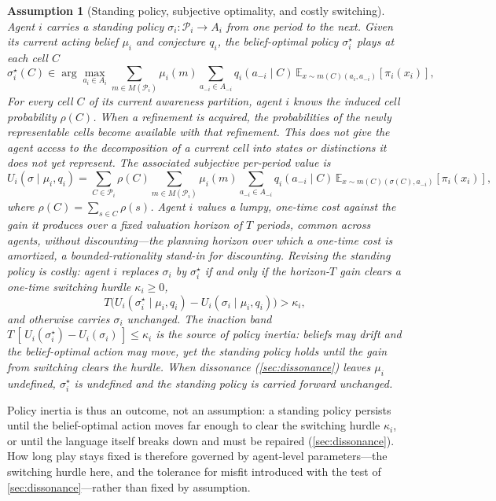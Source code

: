 \documentclass[11pt]{article}
\newtheorem{assumption}{Assumption}[section]
\theoremstyle{definition}
\begin{document}
\begin{assumption}[Standing policy, subjective optimality, and costly switching]
\label{ass:commitment}
Agent $i$ carries a \emph{standing policy} $\sigma_i:\mathcal P_i\to A_i$ from one period to the next.
Given its current acting belief $\mu_i$ and conjecture $q_i$, the \emph{belief-optimal} policy $\sigma_i^{\star}$ plays at each cell $C$
\begin{equation}
\sigma_i^{\star}(C)\in\arg\max_{a_i\in A_i}
\sum_{m\in M(\mathcal P_i)}\mu_i(m)
\sum_{a_{-i}\in A_{-i}}q_i(a_{-i}\mid C)\,
\mathbb E_{x\sim m(C)(a_i,a_{-i})}\!\left[\pi_i(x_i)\right],
\label{eq:subjective-optimality}
\end{equation}
For every cell \(C\) of its current awareness partition, agent \(i\) knows the induced cell probability \(\rho(C)\).
When a refinement is acquired, the probabilities of the newly representable cells become available with that refinement.
This does not give the agent access to the decomposition of a current cell into states or distinctions it does not yet represent.
The associated subjective per-period value is
\begin{equation}
U_i(\sigma\mid\mu_i,q_i)=\sum_{C\in\mathcal P_i}\rho(C)\sum_{m\in M(\mathcal P_i)}\mu_i(m)\sum_{a_{-i}\in A_{-i}}q_i(a_{-i}\mid C)\,\mathbb E_{x\sim m(C)(\sigma(C),a_{-i})}\!\left[\pi_i(x_i)\right],
\label{eq:subjective-value}
\end{equation}
where $\rho(C)=\sum_{s\in C}\rho(s)$.
Agent $i$ values a lumpy, one-time cost against the gain it produces over a fixed \emph{valuation horizon} of $T$ periods, common across agents, without discounting---the planning horizon over which a one-time cost is amortized, a bounded-rationality stand-in for discounting.
Revising the standing policy is costly: agent $i$ replaces $\sigma_i$ by $\sigma_i^{\star}$ if and only if the horizon-$T$ gain clears a one-time \emph{switching hurdle} $\kappa_i\ge0$,
\[
T\bigl(U_i(\sigma_i^{\star}\mid\mu_i,q_i)-U_i(\sigma_i\mid\mu_i,q_i)\bigr)>\kappa_i,
\]
and otherwise carries $\sigma_i$ unchanged.
The inaction band $T\,[\,U_i(\sigma_i^{\star})-U_i(\sigma_i)\,]\le\kappa_i$ is the source of policy inertia: beliefs may drift and the belief-optimal action may move, yet the standing policy holds until the gain from switching clears the hurdle.
When dissonance (\cref{sec:dissonance}) leaves $\mu_i$ undefined, $\sigma_i^{\star}$ is undefined and the standing policy is carried forward unchanged.
\end{assumption}

Policy inertia is thus an outcome, not an assumption: a standing policy persists until the belief-optimal action moves far enough to clear the switching hurdle $\kappa_i$, or until the language itself breaks down and must be repaired (\cref{sec:dissonance}).
How long play stays fixed is therefore governed by agent-level parameters---the switching hurdle here, and the tolerance for misfit introduced with the test of \cref{sec:dissonance}---rather than fixed by assumption.
\end{document}
